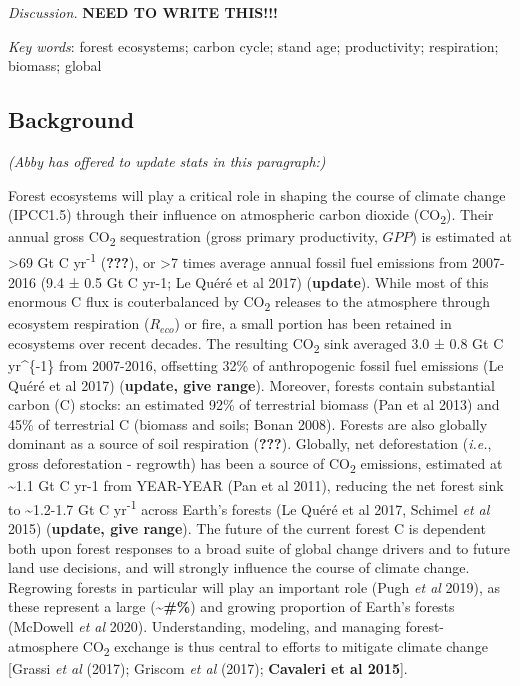 \documentclass[
]{article}
\begin{document}
\emph{Discussion.} \textbf{NEED TO WRITE THIS!!!}

\emph{Key words}: forest ecosystems; carbon cycle; stand age;
productivity; respiration; biomass; global

\newpage

\hypertarget{background}{%
\subsection{Background}\label{background}}

\emph{(Abby has offered to update stats in this paragraph:)}

Forest ecosystems will play a critical role in shaping the course of
climate change (IPCC1.5) through their influence on atmospheric carbon
dioxide (CO\textsubscript{2}). Their annual gross CO\textsubscript{2}
sequestration (gross primary productivity, \(GPP\)) is estimated at
\textgreater69 Gt C yr\textsuperscript{-1} ({\textbf{???}}), or
\textgreater7 times average annual fossil fuel emissions from 2007-2016
(9.4 ± 0.5 Gt C yr-1; Le Quéré et al 2017) (\textbf{update}). While most
of this enormous C flux is couterbalanced by CO\textsubscript{2}
releases to the atmosphere through ecosystem respiration (\(R_{eco}\))
or fire, a small portion has been retained in ecosystems over recent
decades. The resulting CO\textsubscript{2} sink averaged 3.0 ± 0.8 Gt C
yr\^{}\{-1\} from 2007-2016, offsetting 32\% of anthropogenic fossil
fuel emissions (Le Quéré et al 2017) (\textbf{update, give range}).
Moreover, forests contain substantial carbon (C) stocks: an estimated
92\% of terrestrial biomass (Pan et al 2013) and 45\% of terrestrial C
(biomass and soils; Bonan 2008). Forests are also globally dominant as a
source of soil respiration ({\textbf{???}}). Globally, net deforestation
(\emph{i.e.}, gross deforestation - regrowth) has been a source of
CO\textsubscript{2} emissions, estimated at \textasciitilde1.1 Gt C yr-1
from YEAR-YEAR (Pan et al 2011), reducing the net forest sink to
\textasciitilde1.2-1.7 Gt C yr\textsuperscript{-1} across Earth's
forests (Le Quéré et al 2017, Schimel \emph{et al} 2015)
(\textbf{update, give range}). The future of the current forest C is
dependent both upon forest responses to a broad suite of global change
drivers and to future land use decisions, and will strongly influence
the course of climate change. Regrowing forests in particular will play
an important role (Pugh \emph{et al} 2019), as these represent a large
(\textbf{\textasciitilde\#\%}) and growing proportion of Earth's forests
(McDowell \emph{et al} 2020). Understanding, modeling, and managing
forest-atmosphere CO\textsubscript{2} exchange is thus central to
efforts to mitigate climate change {[}Grassi \emph{et al} (2017);
Griscom \emph{et al} (2017); \textbf{Cavaleri et al 2015}{]}.
\end{document}
